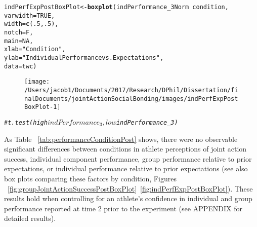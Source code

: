 \documentclass[english]{article}\usepackage[]{graphicx}\usepackage[]{color}
\makeatletter
\def\maxwidth{ %
  \ifdim\Gin@nat@width>\linewidth
    \linewidth
  \else
    \Gin@nat@width
  \fi
}
\newcommand{\hlnum}[1]{\textcolor[rgb]{0.686,0.059,0.569}{#1}}%
\newcommand{\hlstr}[1]{\textcolor[rgb]{0.192,0.494,0.8}{#1}}%
\newcommand{\hlcom}[1]{\textcolor[rgb]{0.678,0.584,0.686}{\textit{#1}}}%
\newcommand{\hlopt}[1]{\textcolor[rgb]{0,0,0}{#1}}%
\newcommand{\hlstd}[1]{\textcolor[rgb]{0.345,0.345,0.345}{#1}}%
\newcommand{\hlkwb}[1]{\textcolor[rgb]{0.69,0.353,0.396}{#1}}%
\newcommand{\hlkwc}[1]{\textcolor[rgb]{0.333,0.667,0.333}{#1}}%
\newcommand{\hlkwd}[1]{\textcolor[rgb]{0.737,0.353,0.396}{\textbf{#1}}}%
\newenvironment{kframe}{%
 \def\at@end@of@kframe{}%
 \ifinner\ifhmode%
  \def\at@end@of@kframe{\end{minipage}}%
  \begin{minipage}{\columnwidth}%
 \fi\fi%
 \def\FrameCommand##1{\hskip\@totalleftmargin \hskip-\fboxsep
 \colorbox{shadecolor}{##1}\hskip-\fboxsep
     \hskip-\linewidth \hskip-\@totalleftmargin \hskip\columnwidth}%
 \MakeFramed {\advance\hsize-\width
   \@totalleftmargin\z@ \linewidth\hsize
   \@setminipage}}%
 {\par\unskip\endMakeFramed%
 \at@end@of@kframe}
\newenvironment{knitrout}{}{} %
\makeatother
\begin{document}
\begin{knitrout}
\color{fgcolor}\begin{kframe}
\begin{alltt}
  \hlstd{indPerfExpPostBoxPlot} \hlkwb{<-} \hlkwd{boxplot}\hlstd{(indPerformance_3Norm} \hlopt{~} \hlstd{condition,}
                                          \hlkwc{varwidth} \hlstd{=} \hlnum{TRUE}\hlstd{,}
                                          \hlkwc{width} \hlstd{=} \hlkwd{c}\hlstd{(}\hlnum{.5}\hlstd{,}\hlnum{.5}\hlstd{),}
                                          \hlkwc{notch} \hlstd{= F,}
                                          \hlkwc{main} \hlstd{=} \hlnum{NA}\hlstd{,}
                                          \hlkwc{xlab} \hlstd{=} \hlstr{"Condition"}\hlstd{,}
                                          \hlkwc{ylab} \hlstd{=} \hlstr{"Individual Performance vs. Expectations"}\hlstd{,}
                                          \hlkwc{data} \hlstd{= twc)}
\end{alltt}
\end{kframe}\begin{figure}

{\centering \texttt{[image: /Users/jacob1/Documents/2017/Research/DPhil/Dissertation/finalDocuments/jointActionSocialBonding/images/indPerfExpPostBoxPlot-1]} 

}

\end{figure}

\begin{kframe}\begin{alltt}
\hlcom{# t.test(high$indPerformance_3, low$indPerformance_3)}
\end{alltt}
\end{kframe}
\end{knitrout}

As Table ~\ref{tab:performanceConditionPost} shows, there were no observable significant differences between conditions in athlete perceptions of joint action success, individual component performance, group performance relative to prior expectations, or individual performance relative to prior expectations (see also box plots comparing these factors by condition, Figures ~\ref{fig:groupJointActionSuccessPostBoxPlot}\nobreakdash~\ref{fig:indPerfExpPostBoxPlot}). These results hold when controlling for an athlete's confidence in individual and group performance reported at time 2 prior to the experiment (see APPENDIX for detailed results).
\end{document}
